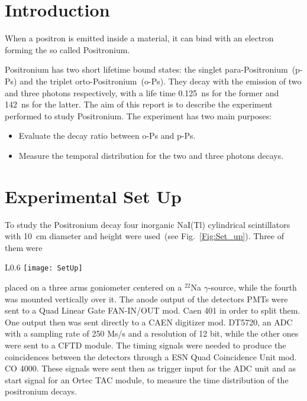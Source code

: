 \section*{Introduction}
When a positron is emitted inside a material, it can bind with an electron forming the so called Positronium. 

Positronium has two short lifetime bound states: the singlet para-Positronium~(p-Ps) and the triplet orto-Positronium~(o-Ps). They decay with the emission of two and three photons respectively, with a  life time 0.125~ns for the former and 142~ns for the latter. 
The aim of this report is to describe the experiment performed to study Positronium. The experiment has two main purposes:
\begin{itemize}
 \item Evaluate the decay ratio between o-Ps and p-Ps.
 \item Measure the temporal distribution for the two and three photons decays.
\end{itemize} 

\section*{Experimental Set Up}

To study the Positronium decay four inorganic NaI(Tl) cylindrical scintillators with 10~cm diameter and height were used~(see Fig.~\ref{Fig:Set_up}). Three of them were

\begin{wrapfigure}{L}{0.6\textwidth}
\centering
\texttt{[image: SetUp]}
\caption{Electronic setup for the study of positronium decay.}
\label{Fig:Set_up}
\end{wrapfigure}
placed on a three arms goniometer centered on a $^{22}$Na $\gamma$-source, while the fourth was mounted vertically over it. The anode output of the detectors PMTs  were sent to a Quad Linear Gate FAN-IN/OUT mod. Caen 401 in order to split them. One output then was sent directly to a CAEN digitizer mod. DT5720, an ADC with a sampling rate of 250 Ms/s and a resolution of 12 bit, while the other ones were sent to a  CFTD module. The timing signals were needed to produce the coincidences between the detectors through a ESN Quad Coincidence Unit mod. CO 4000. These signals were sent then as trigger input for the ADC unit and as start signal for an Ortec TAC module,  to measure the time distribution of the positronium decays.

